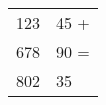 \begin{table}[h!]  
  \begin{tabular}{l@{,}l@{}}
   123 & 45 + \\
   678 & 90 = \\
   \hline
   802 & 35
  \end{tabular}
\end{table}
